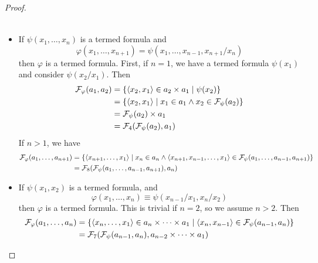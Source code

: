 \begin{proof}
\begin{itemize}
\begin{align*}
        \end{align*}
        \item If \( \psi(x_1, \dots, x_n) \) is a termed formula and
        \[ \varphi(x_1, \dots, x_{n+1}) = \psi(x_1, \dots, x_{n-1}, x_{n+1}/x_n) \]
        then \( \varphi \) is a termed formula.
        First, if \( n = 1 \), we have a termed formula \( \psi(x_1) \) and consider \( \psi(x_2/x_1) \).
        Then
        \begin{align*}
            \mathcal F_\varphi(a_1, a_2) &= \qty{\langle x_2, x_1 \rangle \in a_2 \times a_1 \mid \psi(x_2)} \\
            &= \qty{\langle x_2, x_1 \rangle \mid x_1 \in a_1 \wedge x_2 \in \mathcal F_\psi(a_2)} \\
            &= \mathcal F_\psi(a_2) \times a_1 \\
            &= \mathcal F_4(\mathcal F_\psi(a_2), a_1)
        \end{align*}
        If \( n > 1 \), we have
        \begin{align*}
            \mathcal F_\varphi(a_1, \dots, a_{n+1}) &= \qty{\langle x_{n+1}, \dots, x_1 \rangle \mid x_n \in a_n \wedge \langle x_{n+1}, x_{n-1}, \dots, x_1 \rangle \in \mathcal F_\psi(a_1, \dots, a_{n-1}, a_{n+1})} \\
            &= \mathcal F_8(\mathcal F_\psi(a_1, \dots, a_{n-1}, a_{n+1}), a_n)
        \end{align*}
        \item If \( \psi(x_1, x_2) \) is a termed formula, and
        \[ \varphi(x_1, \dots, x_n) \equiv \psi(x_{n-1}/x_1, x_n/x_2) \]
        then \( \varphi \) is a termed formula.
        This is trivial if \( n = 2 \), so we assume \( n > 2 \).
        Then
        \begin{align*}
            \mathcal F_\varphi(a_1, \dots, a_n) &= \qty{\langle x_n, \dots, x_1 \rangle \in a_n \times \dots \times a_1 \mid \langle x_n, x_{n-1} \rangle \in \mathcal F_\psi(a_{n-1}, a_n)} \\
            &= \mathcal F_7(\mathcal F_\psi(a_{n-1}, a_n), a_{n-2} \times \dots \times a_1)
        \end{align*}
    \end{itemize}


\end{proof}
